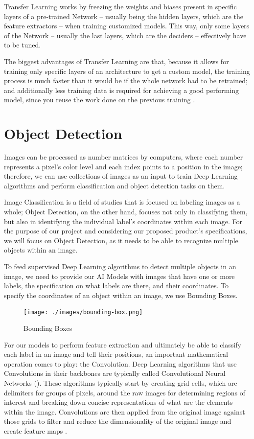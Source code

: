 \documentclass[openright]{normas-utf-tex} %
\begin{document}
Transfer Learning works by freezing the weights and biases present in specific layers of a
pre-trained Network -- usually being the hidden layers, which are the feature extractors -- 
when training customized models. This way,  only some layers of the Network -- usually the last layers, which 
are the deciders -- effectively have to be tuned.

The biggest advantages of Transfer Learning are that, because it allows for
training only specific layers of an architecture to get a custom model, the
training process is much faster than it would be if the whole network had to be
retrained; and additionally less training data is required for achieving a good
performing model, since you reuse the work done on the previous training
\cite{CS231N}.

\section{Object Detection}

Images can be processed as number matrices by computers, where each number represents a 
pixel's color level and each index points to a position in the image;
therefore, we can use collections of images as an input to train Deep Learning algorithms 
and perform classification and object detection tasks on them. 

Image Classification is a field of studies that is focused on labeling images
as a whole; Object Detection, on the other hand, focuses not only in
classifying them, but also in identifying the individual label's coordinates
within each image. For the purpose of our project and considering our proposed
product's specifications, we will focus on Object Detection, as it needs to be
able to recognize multiple objects within an image. 

To feed supervised Deep Learning algorithms to detect multiple objects in an image, we need to provide our AI Models with 
images that have one or more labels, the specification on what labels are there, and their coordinates.
To specify the coordinates of an object within an image, we use Bounding Boxes.

\begin{figure}[H]
	\centering
	\texttt{[image: ./images/bounding-box.png]}
	\caption[Bounding Boxes]{Bounding Boxes}
	\label{fig:boundingBoxes}
\end{figure}

For our models to perform feature extraction and ultimately be able to classify
each label in an image and tell their positions, an important mathematical
operation comes to play: the Convolution. Deep Learning algorithms that use
Convolutions in their backbones are typically called Convolutional Neural
Networks (). These algorithms
typically start by creating grid cells, which are delimiters for groups of
pixels, around the raw images for determining regions of interest and breaking
down concise representations of what are the elements within the image.
Convolutions are then applied from the original image against those grids to
filter and reduce the dimensionality of the original image and create feature
maps \cite{ObjectDetectionDeepLearning}. 
\end{document}
